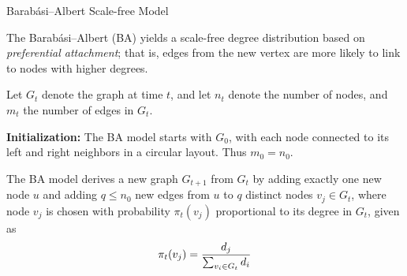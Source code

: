 \begin{frame}{Barab\'{a}si--Albert Scale-free Model}

The Barab\'{a}si--Albert (BA) yields a scale-free degree distribution
based on {\em preferential attachment}; that is,
edges from the new vertex are more likely to link to
nodes with higher degrees.

\smallskip
Let $G_t$ denote the
graph at time $t$, and let $n_t$ denote the number of nodes, and $m_t$
the number of edges in $G_t$.

\medskip
{\bf Initialization:} 
The BA model starts with $G_0$, with each node connected to its left and
right neighbors in a circular layout.
Thus $m_0 = n_0$.


The BA model derives a new graph $G_{t+1}$ from
$G_{t}$ by adding exactly one new node $u$
and adding $q \le n_0$ new edges from $u$ to $q$ distinct
nodes $v_{j} \in G_{t}$, where node $v_{j}$ is
chosen with probability $\pi_{t}(v_{j})$
proportional to its degree in $G_{t}$, given as
\begin{align*}
    \pi_{t}(v_{j}) = {d_{j} \over \sum_{v_i \in G_{t}} d_i}
\end{align*}

\end{frame}


